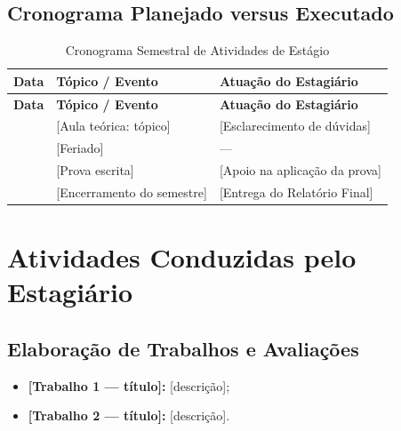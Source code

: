 \documentclass[12pt]{article}
\newif\ifmostrarinstrucoes
\newcommand{\instrucao}[1]{%
  \ifmostrarinstrucoes
  \begin{tcolorbox}[colback=instrbg, colframe=dccblue, arc=2mm, boxrule=0.6pt,
    title=\textbf{INSTRUÇÃO (apagar na versão final)}, fonttitle=\small]
  \small #1
  \end{tcolorbox}
  \fi}
\begin{document}
\subsection{Cronograma Planejado versus Executado}
\instrucao{Inclua uma linha por aula/evento do semestre, indicando sua atuação. Marque feriados com ``---''. Informe se houve alteração em relação à Proposta de Trabalho.}
\begin{longtable}{|p{2.2cm}|p{7.0cm}|p{5.4cm}|}
\caption{Cronograma Semestral de Atividades de Estágio}\label{tab:cronograma}\\
\hline
\textbf{Data} & \textbf{Tópico / Evento} & \textbf{Atuação do Estagiário} \\ \hline
\endfirsthead
\hline
\textbf{Data} & \textbf{Tópico / Evento} & \textbf{Atuação do Estagiário} \\ \hline
\endhead
\hline
\endfoot
[DD/MM/AAAA] & [Aula teórica: tópico] & [Esclarecimento de dúvidas] \\ \hline
[DD/MM/AAAA] & [Feriado] & --- \\ \hline
[DD/MM/AAAA] & [Prova escrita] & [Apoio na aplicação da prova] \\ \hline
[DD/MM/AAAA] & [Encerramento do semestre] & [Entrega do Relatório Final] \\ \hline
\end{longtable}

\newpage
\section{Atividades Conduzidas pelo Estagiário}\label{sec:atividades}
\instrucao{Item 2 das Diretrizes: descreva, de forma objetiva e verificável, cada atividade sob sua responsabilidade (as mesmas previstas na Proposta de Trabalho). Sugestão de subseções abaixo; remova as que não se aplicam e acrescente outras.}

\subsection{Elaboração de Trabalhos e Avaliações}
\instrucao{Para cada trabalho/lista/prova elaborado: objetivo pedagógico, requisitos, formato de entrega e critérios de pontuação.}
\begin{itemize}[leftmargin=*]
    \item \textbf{[Trabalho 1 --- título]:} [descrição];
    \item \textbf{[Trabalho 2 --- título]:} [descrição].
\end{itemize}
\end{document}
